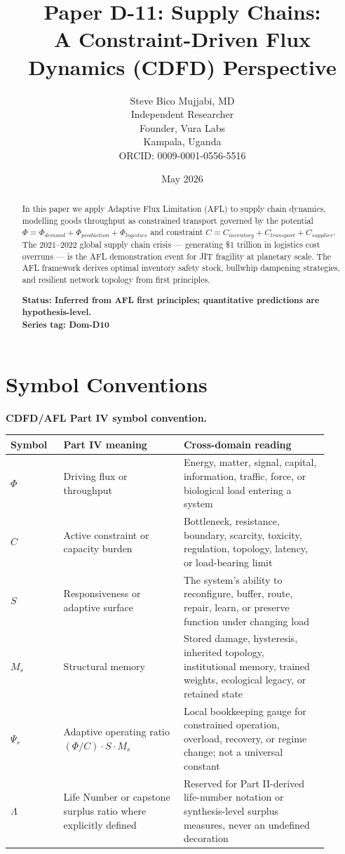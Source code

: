 \documentclass[11pt]{article}
\title{\textbf{Paper D-11: Supply Chains:\\ A Constraint-Driven Flux Dynamics (CDFD) Perspective}}
\author{Steve Bico Mujjabi, MD\\
\small Independent Researcher\\
\small Founder, Vura Labs\\
\small Kampala, Uganda\\
\small ORCID: 0009-0001-0556-5516}
\date{May 2026}
\begin{document}
\maketitle
\newpage


\begin{abstract}
In this paper we apply Adaptive Flux Limitation (AFL) to supply chain dynamics, modelling
goods throughput as constrained transport governed by the potential $\Phi = \Phi_{demand} +
\Phi_{production} + \Phi_{logistics}$ and constraint $C = C_{inventory} + C_{transport} +
C_{supplier}$. The 2021--2022 global supply chain crisis --- generating \$1 trillion in logistics
cost overruns --- is the AFL demonstration event for JIT fragility at planetary scale. The AFL
framework derives optimal inventory safety stock, bullwhip dampening strategies, and resilient
network topology from first principles.

\textbf{Status: Inferred from AFL first principles; quantitative predictions are hypothesis-level.}\\
\textbf{Series tag: Dom-D10}
\end{abstract}

\section*{Symbol Conventions}

\noindent\textbf{CDFD/AFL Part IV symbol convention.}
\begin{center}
{\small
\begin{tabular}{p{0.15\linewidth}p{0.34\linewidth}p{0.41\linewidth}}
\hline
Symbol & Part IV meaning & Cross-domain reading \\
\hline
$\Phi$ & Driving flux or throughput & Energy, matter, signal, capital, information, traffic, force, or biological load entering a system \\
$C$ & Active constraint or capacity burden & Bottleneck, resistance, boundary, scarcity, toxicity, regulation, topology, latency, or load-bearing limit \\
$S$ & Responsiveness or adaptive surface & The system's ability to reconfigure, buffer, route, repair, learn, or preserve function under changing load \\
$M_s$ & Structural memory & Stored damage, hysteresis, inherited topology, institutional memory, trained weights, ecological legacy, or retained state \\
$\Psi_s$ & Adaptive operating ratio $(\Phi/C)\cdot S\cdot M_s$ & Local bookkeeping gauge for constrained operation, overload, recovery, or regime change; not a universal constant \\
$\Lambda$ & Life Number or capstone surplus ratio where explicitly defined & Reserved for Part II-derived life-number notation or synthesis-level surplus measures, never an undefined decoration \\
\hline
\end{tabular}
}
\end{center}
\end{document}
